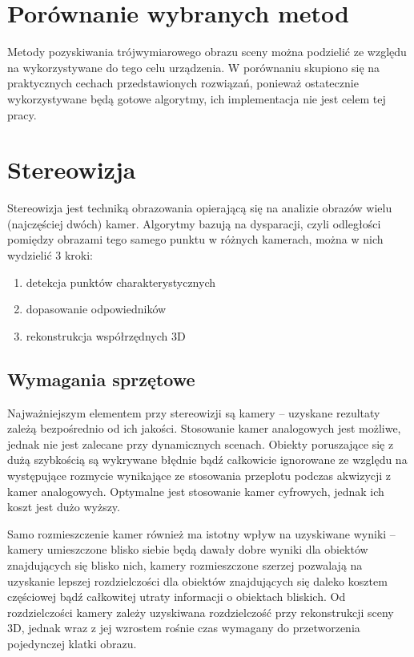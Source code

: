 

\section{Porównanie wybranych metod}

Metody pozyskiwania trójwymiarowego obrazu sceny można podzielić ze względu
na wykorzystywane do tego celu urządzenia. W porównaniu skupiono się na praktycznych
cechach przedstawionych rozwiązań, ponieważ ostatecznie wykorzystywane będą gotowe
algorytmy, ich implementacja nie jest celem tej pracy.

\section{Stereowizja}

Stereowizja jest techniką obrazowania opierającą się na analizie obrazów wielu
(najczęściej dwóch) kamer. Algorytmy bazują na dysparacji, czyli odległości pomiędzy
obrazami tego samego punktu w różnych kamerach, można w nich wydzielić 3 kroki:

\begin{enumerate}
\item detekcja punktów charakterystycznych
\item dopasowanie odpowiedników
\item rekonstrukcja współrzędnych 3D
\end{enumerate}

\subsection{Wymagania sprzętowe}
Najważniejszym elementem przy stereowizji są kamery -- uzyskane rezultaty zależą
bezpośrednio od ich jakości. Stosowanie kamer analogowych jest możliwe, jednak nie
jest zalecane przy dynamicznych scenach. Obiekty poruszające się z dużą szybkością
są wykrywane błędnie bądź całkowicie ignorowane ze względu na występujące rozmycie
wynikające ze stosowania przeplotu podczas akwizycji z kamer analogowych. Optymalne
jest stosowanie kamer cyfrowych, jednak ich koszt jest dużo wyższy.

Samo rozmieszczenie kamer również ma istotny wpływ na uzyskiwane wyniki -- kamery
umieszczone blisko siebie będą dawały dobre wyniki dla obiektów znajdujących się
blisko nich, kamery rozmieszczone szerzej pozwalają na uzyskanie lepszej rozdzielczości
dla obiektów znajdujących się daleko kosztem częściowej bądź całkowitej utraty
informacji o obiektach bliskich. Od rozdzielczości kamery zależy uzyskiwana rozdzielczość
przy rekonstrukcji sceny 3D, jednak wraz z jej wzrostem rośnie czas wymagany do
przetworzenia pojedynczej klatki obrazu.

